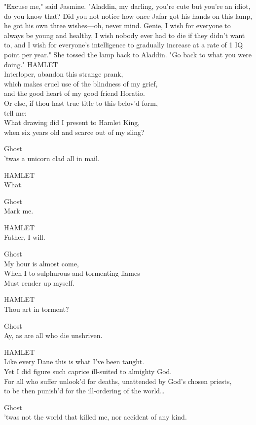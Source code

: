 "Excuse me," said Jasmine. "Aladdin, my darling, you're cute but you're an 
idiot, do you know that? Did you not notice how once Jafar got his hands on 
this lamp, he got his own three wishes---oh, never mind. Genie, I wish for 
everyone to always be young and healthy, I wish nobody ever had to die if they 
didn't want to, and I wish for everyone's intelligence to gradually increase at 
a rate of 1 IQ point per year." She tossed the lamp back to Aladdin. "Go back 
to what you were doing."
\sbreak
HAMLET\\
Interloper, abandon this strange prank,\\
which makes cruel use of the blindness of my grief,\\
and the good heart of my good friend Horatio.\\
Or else, if thou hast true title to this belov'd form,\\
tell me:\\
What drawing did I present to Hamlet King,\\
when six years old and scarce out of my sling?

Ghost\\
'twas a unicorn clad all in mail.

HAMLET\\
What.

Ghost\\
Mark me.

HAMLET\\
Father, I will.

Ghost\\
My hour is almost come,\\
When I to sulphurous and tormenting flames\\
Must render up myself.

HAMLET\\
Thou art in torment?

Ghost\\
Ay, as are all who die unshriven.

HAMLET\\
Like every Dane this is what I've been taught.\\
Yet I did figure such caprice ill-suited to almighty God.\\
For all who suffer unlook'd for deaths, unattended by God's chosen priests,\\
to be then punish'd for the ill-ordering of the world{\ldots}

Ghost\\
'twas not the world that killed me, nor accident of any kind.

